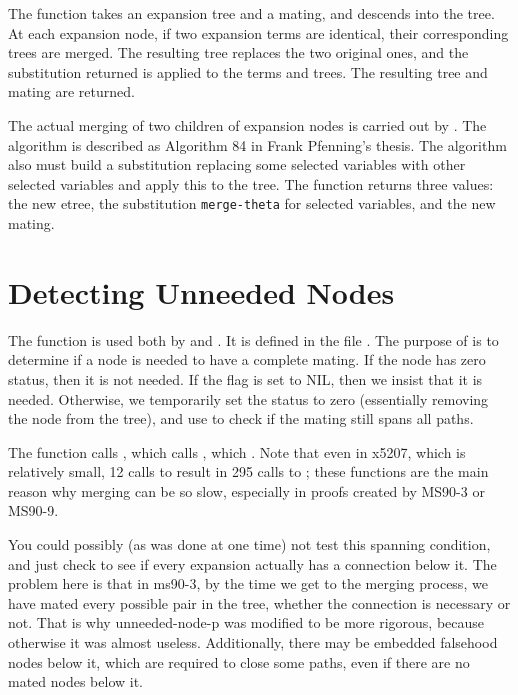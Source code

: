 The function  takes an expansion tree and a mating, and descends into the tree.
At each expansion node, if two expansion terms are identical, their
corresponding trees are merged.  The resulting tree replaces the two
original ones, and the substitution returned is applied to the terms
and trees. The resulting tree and mating are returned.

The actual merging of two children of expansion nodes
is carried out by .
The algorithm is described as Algorithm 84 in Frank Pfenning's thesis\cite{Pfenning86}.
The algorithm also must build a substitution replacing some selected variables
with other selected variables and apply this to the tree.
The function returns three values: the new etree,
the substitution \verb+merge-theta+ for selected variables,
and the new mating.

\section{Detecting Unneeded Nodes}\label{unneeded-node-p}

The function  is used
both by 
and .  It is defined
in the file {\it{}}.
The purpose of  is to
determine if a node is needed to have a complete mating.
If the node has zero status, then
it is not needed.  If the flag 
is set to NIL, then we insist that it is needed.
Otherwise, we temporarily set the status to zero (essentially
removing the node from the tree),
and use  to check if the mating still spans all paths.

The function  calls
, which calls , which
.   Note that even in x5207, which is
relatively small, 12 calls to  result in 295 calls to
; these functions are the main reason why 
merging can be so slow, especially in proofs created 
by MS90-3 or MS90-9.

You could possibly (as was done at one time) not test this spanning 
condition, and just check to see if every expansion actually has a connection 
below it.  The problem here is that in ms90-3, by the time we get to the merging
process, we have mated every possible pair in the tree, whether the connection
is necessary or not.  That is why unneeded-node-p was modified to be more 
rigorous, because otherwise it was almost useless.  Additionally, there may be
embedded falsehood nodes below it, which are required to close some paths,
even if there are no mated nodes below it. 

